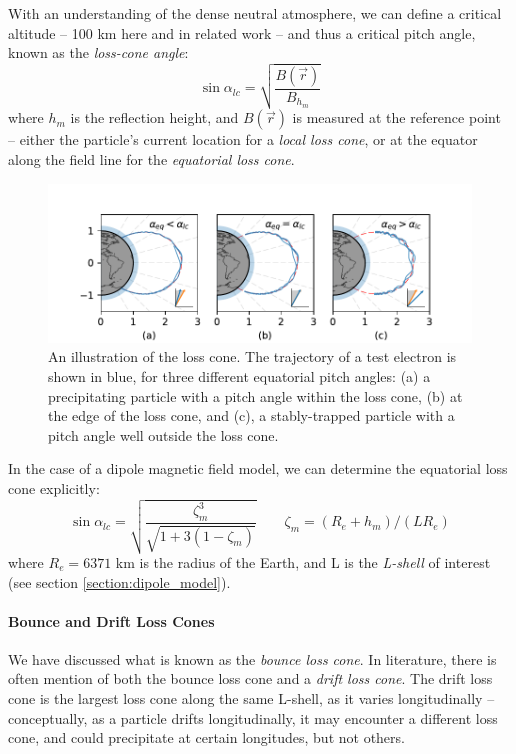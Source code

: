 With an understanding of the dense neutral atmosphere, we can define a critical altitude -- 100 km here and in related work -- and thus a critical pitch angle, known as the \emph{loss-cone angle}:
\begin{equation}
\sin \alpha_{lc} = \sqrt{\frac{B(\vec{r})}{B_{h_m}}}
\end{equation}
where $h_m$ is the reflection height, and $B(\vec{r})$ is measured at the reference point -- either the particle's current location for a \emph{local loss cone}, or at the equator along the field line for the \emph{equatorial loss cone}.

\begin{figure}[h]
\begin{center}
\includegraphics[width=\textwidth]{figures/pitchangle_trapping_3up.pdf}
\caption[Loss cone illustration]{An illustration of the loss cone. The trajectory of a test electron is shown in blue, for three different equatorial pitch angles: (a) a precipitating particle with a pitch angle within the loss cone,  (b) at the edge of the loss cone, and (c), a stably-trapped particle with a pitch angle well outside the loss cone.}
\label{fig:loss_cone_examples}
\end{center}
\end{figure}


In the case of a dipole magnetic field model, we can determine the equatorial loss cone explicitly:
\begin{equation}
\sin \alpha_{lc} = \sqrt{\frac{\zeta_m^3}{\sqrt{1 + 3 (1 - \zeta_m)}}} \qquad \zeta_m = (R_e + h_m) / (L R_e)
\end{equation}
where $R_e = 6371$ km is the radius of the Earth, and L is the \emph{L-shell} of interest (see section \ref{section:dipole_model}).



\paragraph{Bounce and Drift Loss Cones}
We have discussed what is known as the \emph{bounce loss cone}. In literature, there is often mention of both the bounce loss cone and a \emph{drift loss cone}. The drift loss cone is the largest loss cone along the same L-shell, as it varies longitudinally -- conceptually, as a particle drifts longitudinally, it may encounter a different loss cone, and could precipitate at certain longitudes, but not others. 

